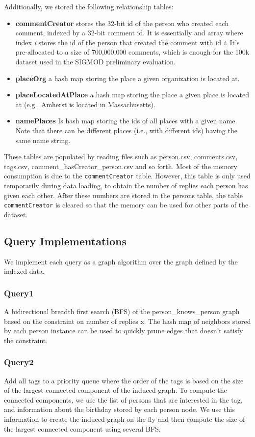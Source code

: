 \documentclass{article}
\begin{document}
Additionally, we stored the following relationship tables: 

\begin{itemize}
\item \textbf{commentCreator} stores the 32-bit id of the person who created each comment, indexed by a 32-bit comment id. It is essentially and array where index \emph{i} stores the id of the person that created the comment with id \emph{i}. It's pre-allocated to a size of 700,000,000 comments, which is enough for the 100k dataset used in the SIGMOD preliminary evaluation. 
\item \textbf{placeOrg} a hash map storing the place a given organization is located at.  
\item \textbf{placeLocatedAtPlace} a hash map storing the place a given place is located at (e.g., Amherst is located in Massachusetts).  
\item \textbf{namePlaces} Is hash map storing the ids of all places with a given name. Note that there can be different places (i.e., with different ids) having the same name string.
\end{itemize}

These tables are populated by reading files such as person.csv, 
comments.csv, tags.csv, comment\_hasCreator\_person.csv and so forth. 
Most of the memory consumption is due to the \texttt{commentCreator} table.
However, this table is only used temporarily during data loading, 
to obtain the number of replies each person has given each other. After
these numbers are stored in the persons table, the table \texttt{commentCreator}
is cleared so that the memory can be used for other parts of the dataset. 

\subsection{Query Implementations}

We implement each query as a graph algorithm over the graph defined by
the indexed data.

\subsubsection{Query1} A bidirectional breadth first search (BFS) of the
person\_knows\_person graph based on the constraint on number of replies
x.  The hash map of neighbors stored by each person instance can be used
to quickly prune edges that doesn't satisfy the constraint. 

\subsubsection{Query2} Add all tags to a priority queue where the order of
the tags is based on the size of the largest connected component of
the induced graph. To compute the connected components, we use the list of persons 
that are interested in the tag, and information about the birthday stored 
by each person node. We use this information to create the induced graph on-the-fly 
and then compute the size of the largest connected component using several BFS.
              
\end{document}
